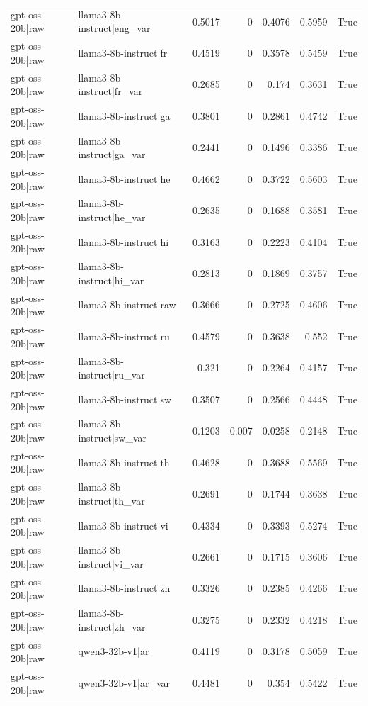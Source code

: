 \begin{table}
\begin{tabular}{l l r r r r l}
gpt-oss-20b|raw & llama3-8b-instruct|eng_var & 0.5017 & 0 & 0.4076 & 0.5959 & True \\
gpt-oss-20b|raw & llama3-8b-instruct|fr & 0.4519 & 0 & 0.3578 & 0.5459 & True \\
gpt-oss-20b|raw & llama3-8b-instruct|fr_var & 0.2685 & 0 & 0.174 & 0.3631 & True \\
gpt-oss-20b|raw & llama3-8b-instruct|ga & 0.3801 & 0 & 0.2861 & 0.4742 & True \\
gpt-oss-20b|raw & llama3-8b-instruct|ga_var & 0.2441 & 0 & 0.1496 & 0.3386 & True \\
gpt-oss-20b|raw & llama3-8b-instruct|he & 0.4662 & 0 & 0.3722 & 0.5603 & True \\
gpt-oss-20b|raw & llama3-8b-instruct|he_var & 0.2635 & 0 & 0.1688 & 0.3581 & True \\
gpt-oss-20b|raw & llama3-8b-instruct|hi & 0.3163 & 0 & 0.2223 & 0.4104 & True \\
gpt-oss-20b|raw & llama3-8b-instruct|hi_var & 0.2813 & 0 & 0.1869 & 0.3757 & True \\
gpt-oss-20b|raw & llama3-8b-instruct|raw & 0.3666 & 0 & 0.2725 & 0.4606 & True \\
gpt-oss-20b|raw & llama3-8b-instruct|ru & 0.4579 & 0 & 0.3638 & 0.552 & True \\
gpt-oss-20b|raw & llama3-8b-instruct|ru_var & 0.321 & 0 & 0.2264 & 0.4157 & True \\
gpt-oss-20b|raw & llama3-8b-instruct|sw & 0.3507 & 0 & 0.2566 & 0.4448 & True \\
gpt-oss-20b|raw & llama3-8b-instruct|sw_var & 0.1203 & 0.007 & 0.0258 & 0.2148 & True \\
gpt-oss-20b|raw & llama3-8b-instruct|th & 0.4628 & 0 & 0.3688 & 0.5569 & True \\
gpt-oss-20b|raw & llama3-8b-instruct|th_var & 0.2691 & 0 & 0.1744 & 0.3638 & True \\
gpt-oss-20b|raw & llama3-8b-instruct|vi & 0.4334 & 0 & 0.3393 & 0.5274 & True \\
gpt-oss-20b|raw & llama3-8b-instruct|vi_var & 0.2661 & 0 & 0.1715 & 0.3606 & True \\
gpt-oss-20b|raw & llama3-8b-instruct|zh & 0.3326 & 0 & 0.2385 & 0.4266 & True \\
gpt-oss-20b|raw & llama3-8b-instruct|zh_var & 0.3275 & 0 & 0.2332 & 0.4218 & True \\
gpt-oss-20b|raw & qwen3-32b-v1|ar & 0.4119 & 0 & 0.3178 & 0.5059 & True \\
gpt-oss-20b|raw & qwen3-32b-v1|ar_var & 0.4481 & 0 & 0.354 & 0.5422 & True \\

\end{tabular}
\end{table}
